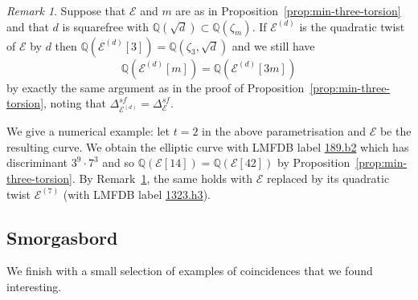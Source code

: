 \documentclass{amsart}
\theoremstyle{plain}
\theoremstyle{remark}
\newtheorem{remark}[theorem]{Remark}
\newcommand{\Q}{\mathbb{Q}}
\newcommand{\E}{\mathcal{E}}
\begin{document}
\begin{remark}\label{rem:hesse-twist}
  Suppose that $\E$ and $m$ are as in Proposition~\ref{prop:min-three-torsion} and that $d$ is squarefree with
  $\Q(\sqrt{d}) \subset \Q(\zeta_m)$. If $\E^{(d)}$ is the quadratic twist of $\E$ by $d$ then
  $\Q(\E^{(d)}[3]) = \Q(\zeta_3, \sqrt{d})$ and we still have
  \[\Q(\E^{(d)}[m]) = \Q(\E^{(d)}[3m])\]
  by exactly the same argument as in the proof of Proposition~\ref{prop:min-three-torsion}, noting that
  $\Delta^{sf}_{\E^{(d)}} = \Delta^{sf}_{\E}$.

  We give a numerical example: let $t = 2$ in the above parametrisation and $\E$ be the resulting curve. We obtain the
  elliptic curve with LMFDB label \href{https://www.lmfdb.org/EllipticCurve/Q/189/b/2}{189.b2} which has discriminant
  $3^9\cdot 7^3$ and so $\Q(\E[14]) = \Q(\E[42])$ by Proposition~\ref{prop:min-three-torsion}. By
  Remark~\ref{rem:hesse-twist}, the same holds with $\E$ replaced by its quadratic twist $\E^{(7)}$ (with LMFDB label
  \href{https://www.lmfdb.org/EllipticCurve/Q/1323/h/3}{1323.h3}).
\end{remark}

\subsection{Smorgasbord}
\label{sec:smorgasbord}

We finish with a small selection of examples of coincidences that we found interesting.
\end{document}
